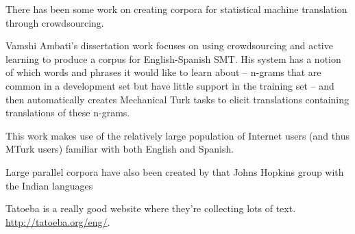 There has been some work on creating corpora for statistical machine
translation through crowdsourcing.

Vamshi Ambati's dissertation work focuses on using crowdsourcing and active
learning to produce a corpus for English-Spanish SMT. His system has a notion
of which words and phrases it would like to learn about -- n-grams that are
common in a development set but have little support in the training set -- and
then automatically creates Mechanical Turk tasks to elicit translations
containing translations of these n-grams.

This work makes use of the relatively large population of Internet users (and
thus MTurk users) familiar with both English and Spanish.

\cite{ambati_naacl}

\cite{ambati_act}

Large parallel corpora have also been created by that Johns Hopkins group
with the Indian languages
\cite{post-callisonburch-osborne:2012:WMT}

Tatoeba is a really good website where they're collecting lots of text.
\url{http://tatoeba.org/eng/}.

